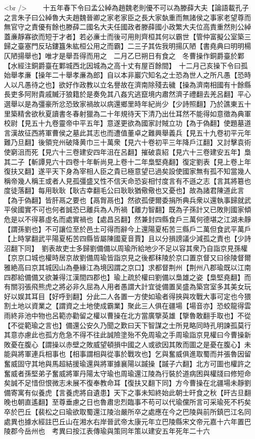 <br />
　　十五年春下令曰孟公綽為趙魏老則優不可以為滕薛大夫【論語載孔子之言朱子曰公綽魯大夫趙魏晉卿之家老家臣之長大家埶重而無諸侯之事家老望尊而無官守之責優有餘也滕薛二國名大夫任國政者滕薛國小政繁大夫位高責重然則公綽蓋亷靜寡欲而短于才者】若必亷士而後可用則齊桓其何以霸世【管仲富擬公室築三歸之臺塞門反玷鏤簋朱紘桓公用之而霸】二三子其佐我明揚仄陋【書堯典曰明明楊仄陋揚舉也】唯才是舉吾得而用之　二月乙巳朔日有食之　冬曹操作銅爵臺於鄴【水經注銅爵臺在鄴城西北因城為之高十丈有屋百餘間】　十二月己亥操下令曰孤始舉孝亷【操年二十舉孝亷為郎】自以本非巖穴知名之士恐為世人之所凡愚【恐時人以凡愚待之也】欲好作政教以立名譽故在濟南除殘去穢【操為濟南相國有十餘縣長吏多阿附貴戚贓汙狼籍於是奏免其八姦宄逃竄境内肅然濟子禮翻去羌呂翻】平心選舉以是為彊豪所忿恐致家禍故以病還鄉里時年紀尚少【少詩照翻】乃於譙東五十里築精舍欲秋夏讀書冬春射獵為二十年規待天下清乃出仕耳然不能得如意徵為典軍校尉【見五十九卷靈帝中平五年】意遂更欲為國家討賊立功【為于偽翻】使題墓道言漢故征西將軍曹侯之墓此其志也而遭值董卓之難興舉義兵【見五十九卷初平元年難乃旦翻】後領兖州破降黄巾三十萬衆【見六十卷初平三年降戶江翻】又討擊袁術使窮沮而死【見六十三卷建安四年沮在呂翻】摧破袁紹【見六十三卷建安五年】梟其二子【斬譚見六十四卷十年斬尚見上卷十二年梟堅堯翻】復定劉表【見上卷上年復扶又翻】遂平天下身為宰相人臣之貴已極意望已過矣設使國家無有孤不知當幾人稱帝幾人稱王或者人見孤彊盛又性不信天命恐妄相忖度言有不遜之志【言其將簒也度徒落翻】每用耿耿【耿古幸翻毛公曰耿耿猶儆儆也又憂也】故為諸君陳道此言【為于偽翻】皆肝鬲之要也【鬲胷鬲也】然欲孤便爾委捐所典兵衆以還執事歸就武平侯國實不可也何者誠恐已離兵為人所禍【離力智翻】既為子孫計又已敗則國家傾危是以不得慕虛名而處實禍也【處昌呂翻】然兼封四縣食戶三萬何德堪之江湖未靜【謂孫劉也】不可讓位至於邑土可得而辭今上還陽夏柘苦三縣戶二萬但食武平萬戶【上時掌翻武平陽夏柘苦四縣皆屬陳國夏音賈】且以分損謗議少減孤之責也【少詩沼翻下同】　劉表故吏士多歸劉備備以周瑜所給地少不足以容其衆乃自詣京見孫權【京京口城也權時居京故劉備周瑜皆詣京見之後都秣陵於京口置京督又曰徐陵督爾雅絶高曰京其城因山為壘緣江為境因謂之京口】求都督荆州【荆州八郡瑜既以江南四郡給備備又欲兼得江漢間四郡也】瑜上疏於權曰劉備以梟雄之姿【梟堅堯翻】而有關羽張飛熊虎之將必非久屈為人用者愚謂大計宜徙備置吴盛為築宫室多其美女玩好以娱其耳目【好呼到翻】分此二人各置一方使如瑜者得挾與攻戰大事可定也今猥割土地以資業之【謂資之土地使成霸業】聚此三人俱在疆場【場音亦】恐蛟龍得雲雨終非池中物也呂範亦勸留之權以曹操在北方當廣擥英雄【擥魯敢翻手取也】不從【不從範瑜之言也】備還公安久乃聞之歎曰天下智謀之士所見略同時孔明諫孤莫行其意亦慮此也孤方危急不得不往此誠險塗殆不免周瑜之手周瑜詣京見權曰今曹操新敗憂在腹心【謂操以赤壁之敗威望頓損中國之人或欲因其敗而圖之是憂在腹心】未能與將軍連兵相事也【相事謂相與從事於戰攻也】乞與奮威俱進取蜀而并張魯因留奮威固守其地與馬超結援瑜還與將軍據襄陽以䠞操【䠞子六翻】北方可圖也權許之奮威者孫堅弟子奮威將軍丹陽太守瑜也周瑜還江陵為行裝於道病困與權牋曰修短命矣誠不足惜但恨微志未展不復奉教命耳【復扶又翻下同】方今曹操在北疆場未靜劉備寄寓有似養虎【言養虎將自遺患】天下之事未知終始此朝士旰食之秋【旰古旦翻晚也朝直遙翻】至尊垂慮之日也魯肅忠烈臨事不苟可以代瑜儻所言可采瑜死不朽矣卒於巴丘【裴松之曰瑜欲取蜀還江陵治嚴所卒之處應在今之巴陵與前所鎮巴江名同處異也據水經註巴丘山在湘水右岸晉武帝太康元年立巴陵縣宋文帝元嘉十六年置巴陵郡今岳州也　考異曰按江表傳瑜與策同年策以建安五年死年二十六